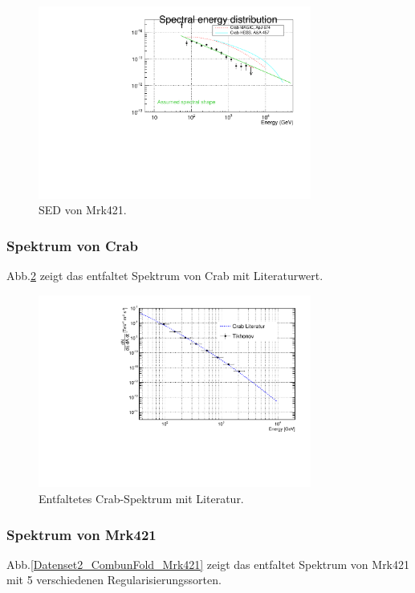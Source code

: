 \begin{figure}
    \centering
    \includegraphics[width=0.8\textwidth]{./Plots/04_MrkAnalyse/Datenset2/SED_Mrk421.pdf}
    \caption{SED von Mrk421.}
    \label{Datenset2_SED_Mrk421}
\end{figure}


\subsubsection{Spektrum von Crab}
Abb.\ref{Datenset2_CombunFold_Crab} zeigt das entfaltet Spektrum von Crab mit Literaturwert.

\begin{figure}
    \centering
    \includegraphics[width=0.8\textwidth]{./Plots/04_MrkAnalyse/Datenset2/Crab_mit_Literatur.pdf}
    \caption{Entfaltetes Crab-Spektrum mit Literatur.}
    \label{Datenset2_CombunFold_Crab}
\end{figure}


\subsubsection{Spektrum von Mrk421}
Abb.\ref{Datenset2_CombunFold_Mrk421} zeigt das entfaltet Spektrum von Mrk421 mit 5 verschiedenen Regularisierungssorten.


